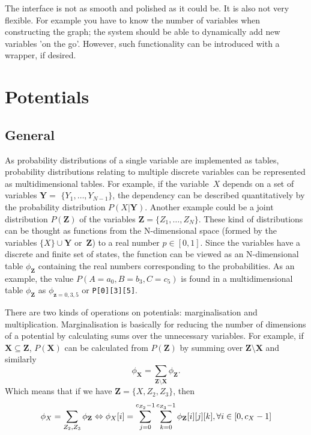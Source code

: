 \documentclass[12pt,a4paper]{report}
\newcommand{\examplecode}[1]{\texttt{#1}}
\begin{document}
The interface is not as smooth and polished as it could be. It is also
not very flexible. For example you have to know the number of
variables when constructing the graph; the system should be able to
dynamically add new variables 'on the go'. However, such functionality
can be introduced with a wrapper, if desired.


\newpage
\section{Potentials}
\subsection{General}
As probability distributions of a single variable are implemented as 
tables, probability distributions relating to multiple discrete
variables can be represented as multidimensional tables. For example, 
if the variable~$X$ depends on a set of variables $\mathbf{Y}=$
$\{Y_1,\dots,Y_{N-1}\}$, the dependency can be described 
quantitatively by the probability distribution $P(X|\mathbf{Y})$. 
Another example could be a joint distribution $P(\mathbf{Z})$ of the 
variables $\mathbf{Z}=\{Z_1,\dots,Z_N\}$. These kind of distributions 
can be thought as functions from the N-dimensional space 
(formed by the variables $\{X\} \cup \mathbf{Y}$ or~$\mathbf{Z}$) 
to a real number $p \in [0,1]$. Since the variables have a discrete
and finite set of states, the function can be viewed as an
N-dimensional table $\phi_\mathbf{Z}$ containing the real numbers 
corresponding to the probabilities. As an example, 
the value $P(A=a_0, B=b_3, C=c_5)$ is found in a multidimensional
table $\phi_\mathbf{Z}$ as $\phi_{\mathbf{z}={0,3,5}}$ or 
\examplecode{P[0][3][5]}. 

There are two kinds of operations on potentials: marginalisation and
multiplication. Marginalisation is basically for reducing the number
of dimensions of a potential by calculating sums over the unnecessary 
variables. For example, if $\mathbf{X} \subseteq \mathbf{Z}$, 
$P(\mathbf{X})$ can be calculated from $P(\mathbf{Z})$ by summing over 
$\mathbf{Z} \setminus \mathbf{X}$ and similarly 
\begin{equation}
\phi_\mathbf{X} = \sum_{\mathbf{Z} \setminus \mathbf{X}} \phi_{\mathbf{Z}}.
\end{equation}
Which means that if we have $\mathbf{Z} = \{X, Z_2, Z_3\}$, then
\begin{equation}
\phi_X = \sum_{Z_2,Z_3} \phi_{\mathbf{Z}} \\
\Leftrightarrow \phi_X[i] = \sum_{j=0}^{c_{Z_2}-1}
\sum_{k=0}^{c_{Z_3}-1} \phi_\mathbf{Z}[i][j][k], \forall i \in [0,c_X-1]
\end{equation}
\end{document}
